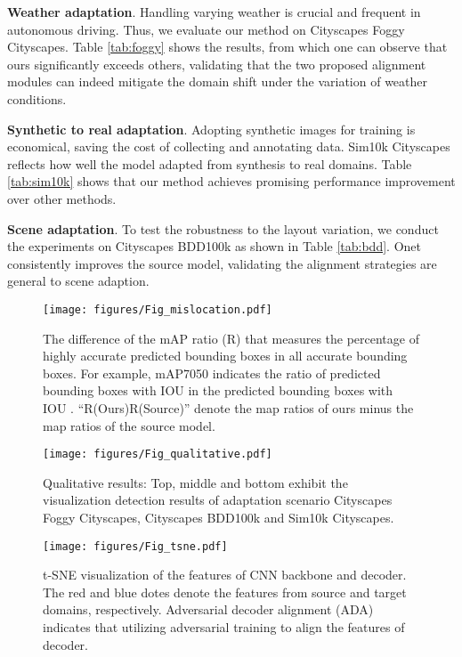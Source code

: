 \documentclass[sigconf]{acmart}
\begin{document}
\textbf{Weather adaptation}. Handling varying weather is crucial and frequent in autonomous driving. Thus, we evaluate our method on Cityscapes  Foggy Cityscapes. Table \ref{tab:foggy} shows the results, from which one can observe that ours significantly exceeds others, validating that the two proposed alignment modules can indeed mitigate the domain shift under the variation of weather conditions.

\textbf{Synthetic to real adaptation}. Adopting synthetic images for training is economical, saving the cost of collecting and annotating data. Sim10k  Cityscapes reflects how well the model adapted from synthesis to real domains. Table \ref{tab:sim10k} shows that our method achieves promising performance improvement over other methods.

\textbf{Scene adaptation}. To test the robustness to the layout variation, we conduct the experiments on Cityscapes  BDD100k as shown in Table \ref{tab:bdd}. Onet consistently improves the source model, validating the alignment strategies are general to scene adaption.


\begin{figure}[t]
    \centerline{\texttt{[image: figures/Fig\_mislocation.pdf]}}
    \vspace{-2mm}
    \caption{The difference of the mAP ratio (R) that measures the percentage of highly accurate predicted bounding boxes in all accurate bounding boxes. For example, mAP7050 indicates the ratio of predicted bounding boxes with IOU  in the predicted bounding boxes with IOU . ``R(Ours)R(Source)'' denote the map ratios of ours minus the map ratios of the source model.}
    \label{fig:fig_mislocation}
    \vspace{-4mm}
\end{figure}


\begin{figure*}[t]
    \centerline{\texttt{[image: figures/Fig\_qualitative.pdf]}}
    \caption{Qualitative results: Top, middle and bottom exhibit the visualization detection results of adaptation scenario Cityscapes  Foggy Cityscapes, Cityscapes  BDD100k and Sim10k  Cityscapes.}
    \label{fig:fig_qualitative}
    \vspace{-4mm}
\end{figure*}



\begin{figure}[t]
    \centerline{\texttt{[image: figures/Fig\_tsne.pdf]}}
    
    \caption{t-SNE \cite{tsne} visualization of the features of CNN backbone and decoder. The red and blue dotes denote the features from source and target domains, respectively. Adversarial decoder alignment (ADA) indicates that utilizing adversarial training to align the features of decoder.}
    \label{fig:fig_tsne}
    \vspace{-6mm}
\end{figure}
\end{document}
